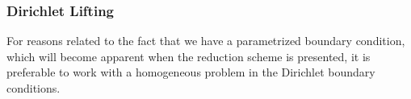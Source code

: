 \documentclass[../../thesis.tex]{subfiles}
\begin{document}




\subsubsection{Dirichlet Lifting}
\label{sec:1d_fom_heat_equation_dirichlet_lifting}
For reasons related to the fact that we have a parametrized boundary condition,
which will become apparent when the reduction scheme is presented,
it is preferable to work with a homogeneous problem in the Dirichlet boundary conditions.
\end{document}
